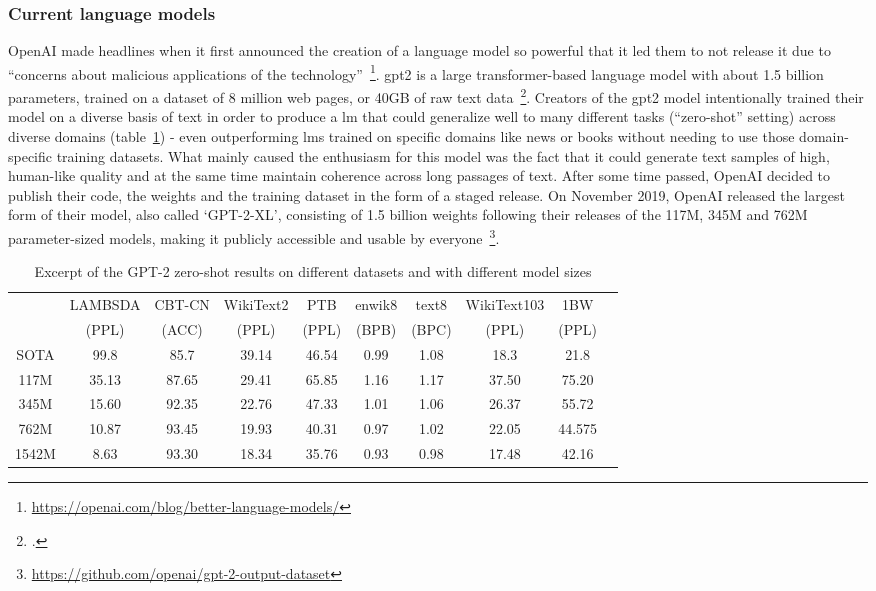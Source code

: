 \subsubsection{Current language models}
\label{sub:current_language models}

OpenAI made headlines when it first announced the creation of a language model so powerful that it led them to not release it due to ``concerns about malicious applications of the technology''~\footnote{\url{https://openai.com/blog/better-language-models/}}. \gls{gpt2} is a large transformer-based language model with about 1.5 billion parameters, trained on a dataset of 8 million web pages, or 40GB of raw text data~\footcite{radford2019language}. Creators of the \gls{gpt2} model intentionally trained their model on a diverse basis of text in order to produce a \gls{lm} that could generalize well to many different tasks (``zero-shot'' setting) across diverse domains (table~\ref{tab:gpt2_benchmark_scores}) - even outperforming \gls{lm}s trained on specific domains like news or books without needing to use those domain-specific training datasets. What mainly caused the enthusiasm for this model was the fact that it could generate text samples of high, human-like quality and at the same time maintain coherence across long passages of text. After some time passed, OpenAI decided to publish their code, the weights and the training dataset in the form of a staged release. On November 2019, OpenAI released the largest form of their model, also called `GPT-2-XL', consisting of 1.5 billion weights following their releases of the 117M, 345M and 762M parameter-sized models, making it publicly accessible and usable by everyone~\footnote{\url{https://github.com/openai/gpt-2-output-dataset}}.

\begin{table}
	\centering
	\caption{Excerpt of the GPT-2 zero-shot results on different datasets and with different model sizes}
	\begin{tabular}{ cccccccccc }
		\hline
		& LAMBSDA & CBT-CN & WikiText2 & PTB & enwik8 & text8 & WikiText103 & 1BW \\
		& (PPL) & (ACC) & (PPL) & (PPL) & (BPB) & (BPC) & (PPL) & (PPL) \\ \hline
		SOTA & 99.8 & 85.7 & 39.14 & 46.54 & 0.99 & 1.08 & 18.3 & 21.8 \\ \hline
		117M & 35.13 & 87.65 & 29.41 & 65.85 & 1.16 & 1.17 & 37.50 & 75.20 \\
		345M & 15.60 & 92.35 & 22.76 & 47.33 & 1.01 & 1.06 & 26.37 & 55.72 \\
		762M & 10.87 & 93.45 & 19.93 & 40.31 & 0.97 & 1.02 & 22.05 & 44.575 \\
		1542M & 8.63 & 93.30 & 18.34 & 35.76 & 0.93 & 0.98 & 17.48 & 42.16 \\ \hline
	\end{tabular}
	\label{tab:gpt2_benchmark_scores}
\end{table}

